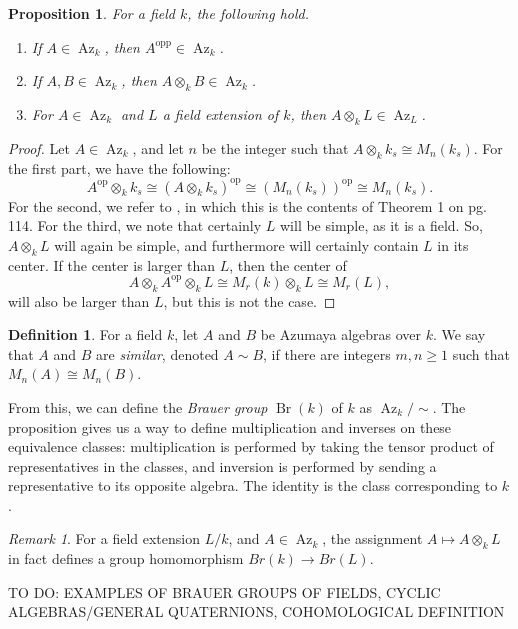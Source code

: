 \documentclass[12pt,twoside]{reedthesis}
\theoremstyle{plain}
\newtheorem{proposition}[theorem]{Proposition}
\theoremstyle{definition}
\newtheorem{definition}{Definition}[section]
\theoremstyle{remark}
\newtheorem{remark}{Remark}[section]
\newcommand{\Br}{\operatorname{Br}}
\newcommand{\Az}{\operatorname{Az}}
\begin{document}
\begin{proposition} For a field $k$, the following hold.
\begin{enumerate} 
\item If $A\in\Az_k$, then $A^{\text{opp}}\in\Az_k$.
\item If $A,B\in\Az_k$, then $A\otimes_k B\in\Az_k$.
\item For $A\in\Az_k$ and $L$ a field extension of $k$, then $A\otimes_k L\in\Az_L$.
\end{enumerate}
\end{proposition}
\begin{proof}
Let $A\in\Az_k$, and let $n$ be the integer such that $A\otimes_k k_s\cong M_n(k_s)$. For the first part, we have the following:
\[
A^\text{op}\otimes_k k_s\cong(A\otimes_k k_s)^\text{op}\cong(M_n(k_s))^\text{op}\cong M_n(k_s).
\]
For the second, we refer to \cite{jacobson}, in which this is the contents of Theorem 1 on pg. 114. For the third, we note that certainly $L$ will be simple, as it is a field. So, $A\otimes_k L$ will again be simple, and furthermore will certainly contain $L$ in its center. If the center is larger than $L$, then the center of 
\[
A\otimes_k A^{\text{op}}\otimes_k L\cong M_r(k)\otimes_k L\cong M_r(L),
\]
will also be larger than $L$, but this is not the case.
\end{proof}
\begin{definition}
For a field $k$, let $A$ and $B$ be Azumaya algebras over $k$. We say that $A$ and $B$ are \emph{similar}, denoted $A\sim B$, if there are integers $m,n\geq1$ such that $M_n(A)\cong M_n(B)$.
\end{definition}
\noindent From this, we can define the \emph{Brauer group} $\Br(k)$ of $k$ as $\Az_k/\sim$. The proposition gives us a way to define multiplication and inverses on these equivalence classes: multiplication is performed by taking the tensor product of representatives in the classes, and inversion is performed by sending a representative to its opposite algebra. The identity is the class corresponding to $k$.
\begin{remark}
For a field extension $L/k$, and $A\in\Az_k$, the assignment $A\mapsto A\otimes_k L$ in fact defines a group homomorphism $Br(k)\to Br(L)$.
\end{remark}
TO DO: EXAMPLES OF BRAUER GROUPS OF FIELDS, CYCLIC ALGEBRAS/GENERAL QUATERNIONS, COHOMOLOGICAL DEFINITION
\end{document}
